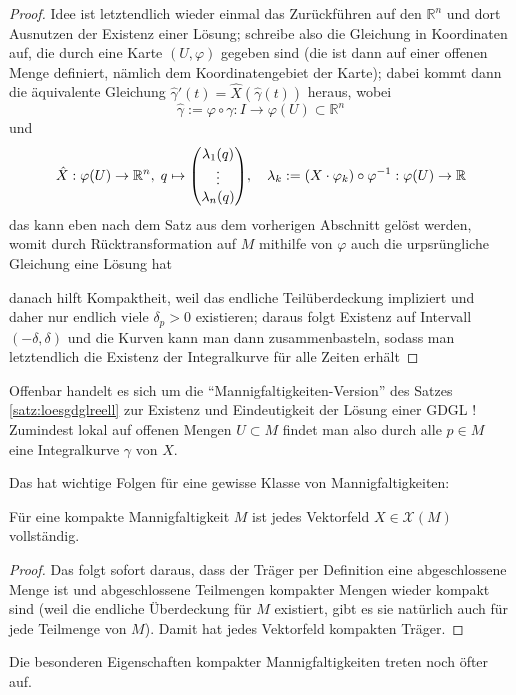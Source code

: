 \documentclass[../H_Analysis_main.tex]{subfiles}
\begin{document}
\begin{proof}
Idee ist letztendlich wieder einmal das Zurückführen auf den $\mathbb{R}^n$ und dort Ausnutzen der Existenz einer Lösung; schreibe also die Gleichung in Koordinaten auf, die durch eine Karte $(U, \varphi)$ gegeben sind (die ist dann auf einer offenen Menge definiert, nämlich dem Koordinatengebiet der Karte); dabei kommt dann die äquivalente Gleichung $\hat{\gamma}'(t) = \hat{X}(\hat{\gamma}(t))$ heraus, wobei
\begin{equation}
\hat{\gamma} := \varphi \circ \gamma: I \rightarrow \varphi(U) \subset \mathbb{R}^n
\end{equation}
und
\begin{equation}
\hat{X}: \varphi(U) \rightarrow \mathbb{R}^n, \; q \mapsto \mqty(\lambda_1(q) \\ \vdots \\ \lambda_n(q)), \quad \lambda_k := \qty(X \cdot \varphi_k) \circ \varphi^{-1}: \varphi(U) \rightarrow \mathbb{R}
\end{equation}
das kann eben nach dem Satz aus dem vorherigen Abschnitt gelöst werden, womit durch Rücktransformation auf $M$ mithilfe von $\varphi$ auch die urpsrüngliche Gleichung eine Lösung hat

danach hilft Kompaktheit, weil das endliche Teilüberdeckung impliziert und daher nur endlich viele $\delta_p > 0$ existieren; daraus folgt Existenz auf Intervall $(-\delta, \delta)$ und die Kurven kann man dann zusammenbasteln, sodass man letztendlich die Existenz der Integralkurve für alle Zeiten erhält
\end{proof}

Offenbar handelt es sich um die \enquote{Mannigfaltigkeiten-Version} des Satzes \ref{satz:loesgdglreell} zur Existenz und Eindeutigkeit der Lösung einer GDGL ! Zumindest lokal auf offenen Mengen $U \subset M$ findet man also durch alle $p \in M$ eine Integralkurve $\gamma$ von $X$.

Das hat wichtige Folgen für eine gewisse Klasse von Mannigfaltigkeiten:
\begin{cor}
Für eine kompakte Mannigfaltigkeit $M$ ist jedes Vektorfeld $X \in \mathcal{X}(M)$ vollständig.
\end{cor}
\begin{proof}
Das folgt sofort daraus, dass der Träger per Definition eine abgeschlossene Menge ist und abgeschlossene Teilmengen kompakter Mengen wieder kompakt sind (weil die endliche Überdeckung für $M$ existiert, gibt es sie natürlich auch für jede Teilmenge von $M$). Damit hat jedes Vektorfeld kompakten Träger.
\end{proof}
Die besonderen Eigenschaften kompakter Mannigfaltigkeiten treten noch öfter auf.\\
\end{document}
